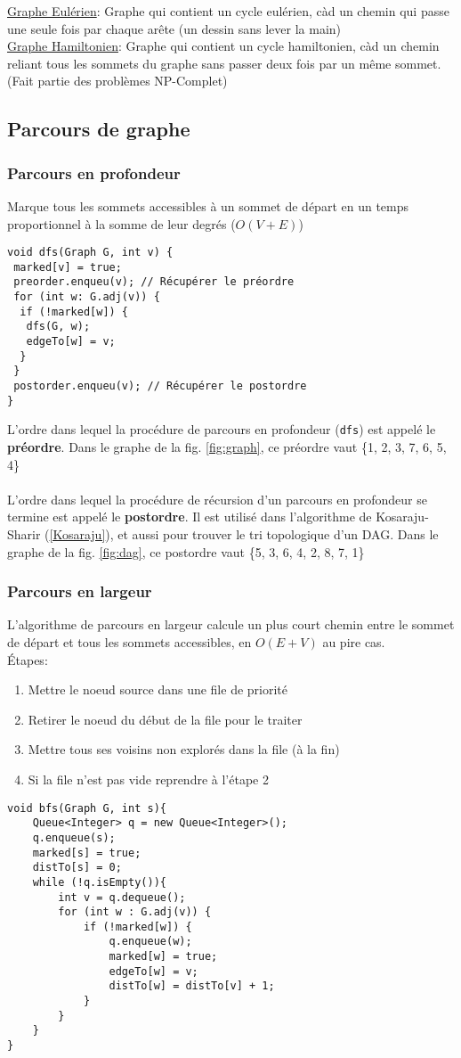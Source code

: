 \documentclass[10pt]{article}
\begin{document}
\underline{Graphe Eulérien}: Graphe qui contient un cycle eulérien, càd un chemin qui passe une seule fois par chaque arête (un dessin sans lever la main)
\\\underline{Graphe Hamiltonien}: Graphe qui contient un cycle hamiltonien, càd un chemin reliant tous les sommets du graphe sans passer deux fois par un même sommet. (Fait partie des problèmes NP-Complet)

\subsection{Parcours de graphe}
\subsubsection{Parcours en profondeur}
\label{dfs}
Marque tous les sommets accessibles à un sommet de départ en un temps proportionnel à la somme de leur degrés ($O(V + E)$)
\begin{verbatim}
void dfs(Graph G, int v) {
 marked[v] = true;
 preorder.enqueu(v); // Récupérer le préordre
 for (int w: G.adj(v)) {
  if (!marked[w]) {
   dfs(G, w);
   edgeTo[w] = v;
  }
 }
 postorder.enqueu(v); // Récupérer le postordre
}
\end{verbatim}
L'ordre dans lequel la procédure de parcours en profondeur (\verb|dfs|) est appelé le \textbf{préordre}. 
Dans le graphe de la fig. \ref{fig:graph}, ce préordre vaut \{1, 2, 3, 7, 6, 5, 4\}
\\
\\ L'ordre dans lequel la procédure de récursion d'un parcours en profondeur se termine est appelé le \textbf{postordre}. Il est utilisé dans l'algorithme de Kosaraju-Sharir (\ref{Kosaraju}), et aussi pour trouver le tri topologique d'un DAG.
Dans le graphe de la fig. \ref{fig:dag}, ce postordre vaut \{5, 3, 6, 4, 2, 8, 7, 1\}

\subsubsection{Parcours en largeur}
L'algorithme de parcours en largeur calcule un plus court chemin entre le sommet de départ et tous les sommets accessibles, en $O(E+V)$ au pire cas.
\\Étapes:
\begin{enumerate}
\item Mettre le noeud source dans une file de priorité
\item Retirer le noeud du début de la file pour le traiter
\item Mettre tous ses voisins non explorés dans la file (à la fin)
\item Si la file n'est pas vide reprendre à l'étape 2
\end{enumerate}
\begin{verbatim}
void bfs(Graph G, int s){
	Queue<Integer> q = new Queue<Integer>();
 	q.enqueue(s);
	marked[s] = true;
	distTo[s] = 0;
 	while (!q.isEmpty()){
  		int v = q.dequeue();
  		for (int w : G.adj(v)) {
   			if (!marked[w]) {
    			q.enqueue(w);
    			marked[w] = true;
    			edgeTo[w] = v;
    			distTo[w] = distTo[v] + 1;
   			}
  		}
 	}
}   
\end{verbatim}
\end{document}
